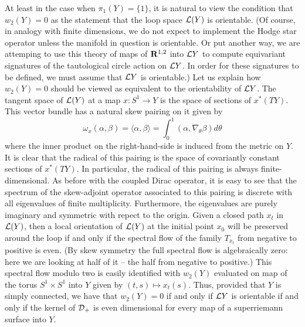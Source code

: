 At least in the case when $\pi_1(Y)=\{1\}$,
it is natural to view the condition that $w_2(Y)=0$  as
the statement that the loop space ${\cal L}(Y)$ is orientable.  
(Of course, in analogy with finite dimensions, we do not expect to
implement the Hodge star operator unless the manifold in question is
orientable. Or put another way, we are attemping to use this theory of
maps of ${\bf R}^{1,2}$ into ${\cal L}Y$ to compute equivariant
signatures of the tautological circle action on ${\cal L}Y$.  In order
for these signatures to be defined, we must assume that ${\cal L}Y$ is
orientable.) 
Let us explain how $w_2(Y)=0$ should be viewed as equivalent to the
orientability of ${\cal L}Y$.
The tangent space of ${\cal L}(Y)$ at a map $x\colon S^1\to Y$ is the
space of sections of $x^*(TY)$. This vector bundle has a natural skew
pairing on it given by 
$$\omega_x(\alpha,\beta)=\langle
\alpha,\beta\rangle=\int_0^1(\alpha,\nabla_\theta\beta)d\theta$$
where the inner product on the right-hand-side is induced from the
metric on $Y$. It is clear that the radical of this pairing is the
space of covariantly constant sections of $x^*(TY)$.  In particular,
the radical of this pairing is always finite-dimensional.
As before with the coupled Dirac operator, it is easy to see that the
spectrum of the skew-adjoint operator associated to  this 
pairing is discrete with all eigenvalues of finite multiplicity.
Furthermore,
the eigenvalues are purely imaginary and symmetric with repect to the
origin. 
Given a closed path $x_t$ in ${\cal L}(Y)$, then a local orientation
of ${\cal L}(Y)$ at the initial point $x_0$ will be preserved around
the loop if and only if the spectral flow of the family $T_{x_t}$ from
negative to positive is even.  (By skew symmetry the full spectral
flow is algebraically zero: here we are looking at half of it -- the
half from negative to positive.)
This spectral flow modulo two is easily identified with $w_2(Y)$
evaluated on map of the torus 
$S^1\times S^1$ into $Y$ given by $(t,s)\mapsto x_t(s)$.  Thus,
provided that $Y$ is simply connected, we have that $w_2(Y)=0$ if and
only if ${\cal L}Y$ is orientable if and only if the kernel of ${\cal
D}_+$ is even dimensional for every map of a superriemann surface into
$Y$. 





